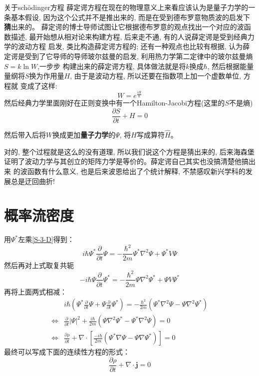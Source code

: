 \documentclass[a4paper,zihao=-4,linespread=1]{ctexrep}
\begin{document}
    \begin{history}{关于sch\"{o}dinger方程}
        薛定谔方程在现在的物理意义上来看应该认为是量子力学的一条基本假设, 因为这个公式并不是推出来的, 而是在受到德布罗意物质波的启发下\textbf{猜}出来的。
        薛定谔的博士导师试图让它根据德布罗意的观点找出一个对应的波函数描述, 最开始想从相对论来构建方程, 后来走不通, 有的人说薛定谔是受到经典力学的波动方程
        启发, 类比构造薛定谔方程的; 还有一种观点也比较有根据, 认为薛定谔是受到了它导师的导师玻尔兹曼的启发, 利用热力学第二定律中的玻尔兹曼熵$S=k\ln W$,一步步
        构建出来的薛定谔方程, 具体做法就是将$k$换成$\hbar$, 然后根据能量量纲将$S$换为作用量$H$, 由于是波动方程, 所以还要在指数项上加一个虚数单位, 方程就
        变成了这样:$$W=e^{\frac{iH}{\hbar}}$$然后经典力学里面刚好在正则变换中有一个Hamilton-Jacobi方程(这里的$S$不是熵)$$\frac{\partial S}{\partial t}+H=0$$
        
        然后带入后将$W$换成更加\textbf{量子力学}的$\Psi$, 将$H$写成算符$\hat{H}$。

        \setlength\parindent{2em}对的, 整个过程就是这么的没有道理, 所以我们说这个方程是猜出来的, 后来海森堡证明了波动力学与其创立的矩阵力学是等价的。薛定谔自己其实也没搞清楚他搞出来
        的波函数有什么意义, 也是后来波恩给出了个统计解释, 不禁感叹新兴学科的发展总是迂回曲折!
    \end{history}
	\section{概率流密度}
	用$\Psi^*$左乘\ref{S-3-D}得到：
	\begin{equation}
		i\hbar\Psi^*\frac{\partial}{\partial t}\Psi=-\frac{\hbar^2}{2m}\Psi^*\nabla^2\Psi+\Psi^*V\Psi
	\end{equation}
	然后再对上式取复共轭
	\begin{equation}
		-i\hbar\Psi\frac{\partial}{\partial 	t}\Psi^*=-\frac{\hbar^2}{2m}\Psi\nabla^2\Psi^*+\Psi V\Psi^*
	\end{equation}
	再将上面两式相减：
	\begin{equation*}
		\begin{aligned}
			&i\hbar \left(\Psi^*\frac{\partial}{\partial t}\Psi+\Psi\frac{\partial}{\partial t}\Psi^*\right)=-\frac{\hbar^2}{2m}\left(\Psi^*\nabla^2\Psi-\Psi\nabla^2\Psi^*\right)\\
			\Leftrightarrow&\frac{\partial}{\partial t}|\Psi|^2+\frac{i\hbar}{2m}\left(\Psi\nabla^2\Psi^*-\Psi^*\nabla^2\Psi\right)=0\\
			\Leftrightarrow&\frac{\partial\rho}{\partial t}+\nabla\cdot\left[\frac{-i\hbar}{2m}\left(\Psi^*\nabla\Psi-\Psi\nabla\Psi^*\right)\right]=0
		\end{aligned}
	\end{equation*}
	最终可以写成下面的连续性方程的形式：
	\begin{equation}
		\label{eq:1.12}
		\boxed{
			\frac{\partial\rho}{\partial t}+\nabla\cdot\mathbf{j}=0}
	\end{equation}
	
\end{document}
